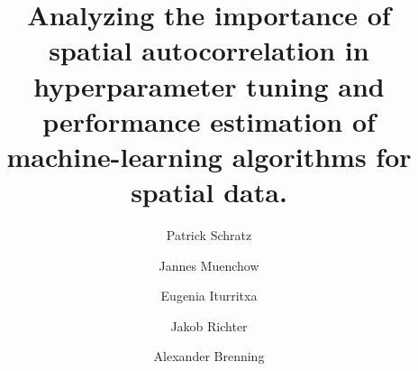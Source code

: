 \documentclass[review]{elsarticle}
\begin{document}
 

\begin{frontmatter}

	\title{Analyzing the importance of spatial autocorrelation in hyperparameter tuning and performance estimation of machine-learning algorithms for spatial data.} 

	\author[FSU]{Patrick Schratz}

	\author[FSU]{Jannes Muenchow}
	\author[NEIKER]{Eugenia Iturritxa}
	\author[TUDO]{Jakob Richter}
	\author[FSU]{Alexander Brenning}

	\address[FSU]{Department of Geography, GIScience group, Grietgasse 6, 07743, Jena, Germany}
	\address[NEIKER]{NEIKER, Granja Modelo –Arkaute, Apdo. 46, 01080 Vitoria-Gasteiz, Arab, Spain}
	\address[TUDO]{Department of Statistics, TU Dortmund University, Germany}


\end{frontmatter}
\end{document}
